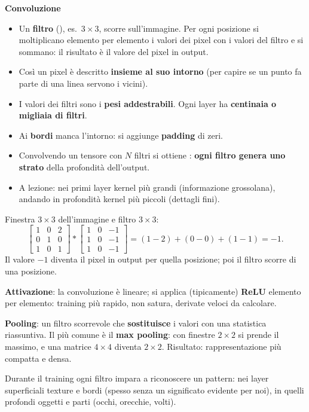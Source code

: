 \textbf{Convoluzione}
\begin{itemize}
  \item Un \textbf{filtro} (), es.\ $3\times3$, scorre sull'immagine. Per ogni posizione si moltiplicano elemento per elemento
        i valori dei pixel con i valori del filtro e si sommano: il risultato è il valore del pixel in output.
  \item Così un pixel è descritto \textbf{insieme al suo intorno} (per capire se un punto fa parte di una linea servono i vicini).
  \item I valori dei filtri sono i \textbf{pesi addestrabili}. Ogni layer ha \textbf{centinaia o migliaia di filtri}.
  \item Ai \textbf{bordi} manca l'intorno: si aggiunge \textbf{padding} di zeri.
  \item Convolvendo un tensore \code{[d,h,w]} con $N$ filtri si ottiene \code{[N,h,w]}: \textbf{ogni filtro genera uno strato} della profondità
        dell'output.
  \item A lezione: nei primi layer kernel più grandi (informazione grossolana), andando in profondità kernel più piccoli (dettagli fini).
\end{itemize}
\begin{esempio}
Finestra $3\times3$ dell'immagine e filtro $3\times3$:
\[
\begin{bmatrix}1&0&2\\0&1&0\\1&0&1\end{bmatrix} \ast
\begin{bmatrix}1&0&-1\\1&0&-1\\1&0&-1\end{bmatrix}
= (1-2) + (0-0) + (1-1) = -1 .
\]
Il valore $-1$ diventa il pixel in output per quella posizione; poi il filtro scorre di una posizione.
\end{esempio}
\textbf{Attivazione}: la convoluzione è lineare; si applica (tipicamente) \textbf{ReLU} elemento per elemento: training più rapido,
non satura, derivate veloci da calcolare.

\textbf{Pooling}: un filtro scorrevole che \textbf{sostituisce} i valori con una statistica riassuntiva. Il più comune è il
\textbf{max pooling}: con finestre $2\times2$ si prende il massimo, e una matrice $4\times4$ diventa $2\times2$.
Risultato: rappresentazione più compatta e densa.

Durante il training ogni filtro impara a riconoscere un pattern: nei layer superficiali texture e bordi (spesso senza un significato
evidente per noi), in quelli profondi oggetti e parti (occhi, orecchie, volti).

